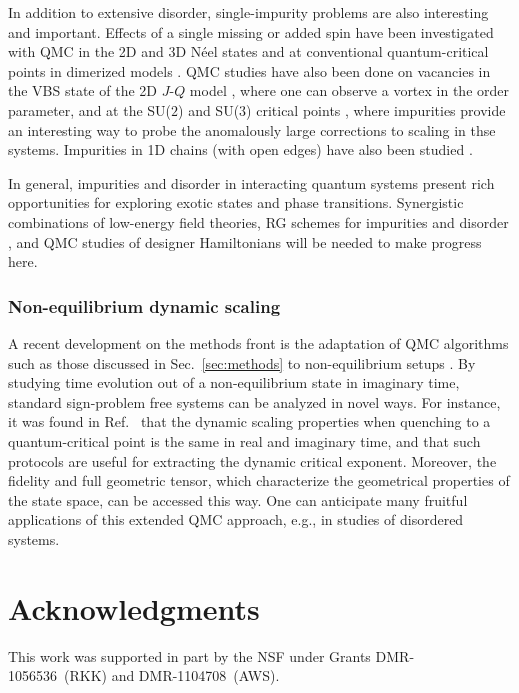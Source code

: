 \documentclass[range]{ar2e}
\begin{document}
In addition to extensive disorder, single-impurity problems are also interesting and important. Effects of a single missing or added spin have been
investigated with QMC in the 2D and 3D N\'eel states \cite{Hoglund04} and at conventional quantum-critical points in dimerized models \cite{Hoglund07}. 
QMC studies have also been done on vacancies in the VBS state of the 2D $J$-$Q$ model \cite{Kaul08}, where one can observe a vortex in the order parameter, 
and at the SU($2$) and SU($3$) critical points \cite{banerjee2010:log,banerjee2010:su3}, where impurities provide an interesting way to probe the anomalously 
large corrections to scaling in thse systems. Impurities in 1D chains (with open edges) have also been studied \cite{Sanyal11}.

In general, impurities and disorder in interacting quantum systems present rich opportunities for exploring exotic states and phase transitions.
Synergistic combinations of low-energy field theories, RG schemes for impurities \cite{Vojta12} and disorder \cite{Hoyos08,Vojta10,Altman10,Iyer12}, 
and QMC studies of designer Hamiltonians will be needed to make progress here.

\subsubsection{Non-equilibrium dynamic scaling}

A recent development on the methods front is the adaptation of QMC algorithms such as those discussed in Sec.~\ref{sec:methods} to non-equilibrium 
setups \cite{Degrandi11}. By studying time evolution out of a non-equilibrium state in imaginary time, standard sign-problem free systems
can be analyzed in novel ways. For instance, it was found in Ref.~\cite{Degrandi11} that the dynamic scaling properties when quenching to
a quantum-critical point is the same in real and imaginary time, and that such protocols are useful for extracting the dynamic critical
exponent. Moreover, the fidelity and full geometric tensor, which characterize the geometrical properties of the state space, can be
accessed this way. One can anticipate many fruitful applications of this extended QMC approach, e.g., in studies of disordered systems.

\section*{Acknowledgments}

This work was supported in part by the NSF under Grants DMR-1056536~(RKK) and DMR-1104708~(AWS).



\end{document}
